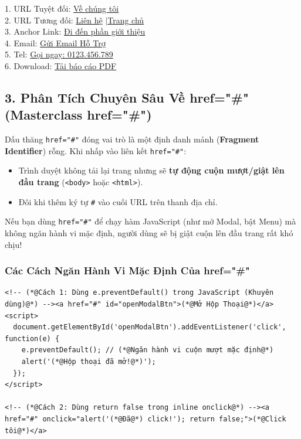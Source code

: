 \documentclass[11pt,oneside]{book}
\newcommand{\codeinline}[1]{\textcolor{accentOrange}{\texttt{#1}}}
\newcommand{\term}[1]{\textbf{\textcolor{primaryBlue}{#1}}}
\begin{document}
\begin{browserWindow}
\sffamily\small
1. URL Tuyệt đối: \textcolor{primaryBlue}{\underline{Về chúng tôi}}\\[2pt]
2. URL Tương đối: \textcolor{primaryBlue}{\underline{Liên hệ}} \quad$\vert$\quad \textcolor{primaryBlue}{\underline{Trang chủ}}\\[2pt]
3. Anchor Link: \textcolor{primaryBlue}{\underline{Đi đến phần giới thiệu}}\\[2pt]
4. Email: \textcolor{primaryBlue}{\underline{Gửi Email Hỗ Trợ}}\\[2pt]
5. Tel: \textcolor{primaryBlue}{\underline{Gọi ngay: 0123.456.789}}\\[2pt]
6. Download: \textcolor{primaryBlue}{\underline{Tải báo cáo PDF}}
\end{browserWindow}

\subsection{3. Phân Tích Chuyên Sâu Về href="\#" (Masterclass href="\#")}
Dấu thăng \codeinline{href="\#"} đóng vai trò là một định danh mảnh (\term{Fragment Identifier}) rỗng. Khi nhấp vào liên kết \codeinline{href="\#"}:
\begin{itemize}
    \item Trình duyệt không tải lại trang nhưng sẽ \textbf{tự động cuộn mượt/giật lên đầu trang} (\codeinline{<body>} hoặc \codeinline{<html>}).
    \item Đôi khi thêm ký tự \codeinline{\#} vào cuối URL trên thanh địa chỉ.
\end{itemize}

\begin{warnBox}[Cạm Bẫy Giật Cuộn Trang Khi Dùng href="\#"]
Nếu bạn dùng \codeinline{href="\#"} để chạy hàm JavaScript (như mở Modal, bật Menu) mà không ngăn hành vi mặc định, người dùng sẽ bị giật cuộn lên đầu trang rất khó chịu!
\end{warnBox}

\subsubsection{Các Cách Ngăn Hành Vi Mặc Định Của href="\#"}
\begin{codeWindow}[Mã Nguồn: Ngăn Hành Vi Cuộn Trang Khi Dùng href="\#"]
\begin{lstlisting}[language=HTML5]
<!-- (*@Cách 1: Dùng e.preventDefault() trong JavaScript (Khuyên dùng)@*) --><a href="#" id="openModalBtn">(*@Mở Hộp Thoại@*)</a><script>
  document.getElementById('openModalBtn').addEventListener('click', function(e) {
    e.preventDefault(); // (*@Ngăn hành vi cuộn mượt mặc định@*)
    alert('(*@Hộp thoại đã mở!@*)');
  });
</script>

<!-- (*@Cách 2: Dùng return false trong inline onclick@*) --><a href="#" onclick="alert('(*@Đã@*) click!'); return false;">(*@Click tôi@*)</a>
\end{lstlisting}
\end{codeWindow}
\end{document}
